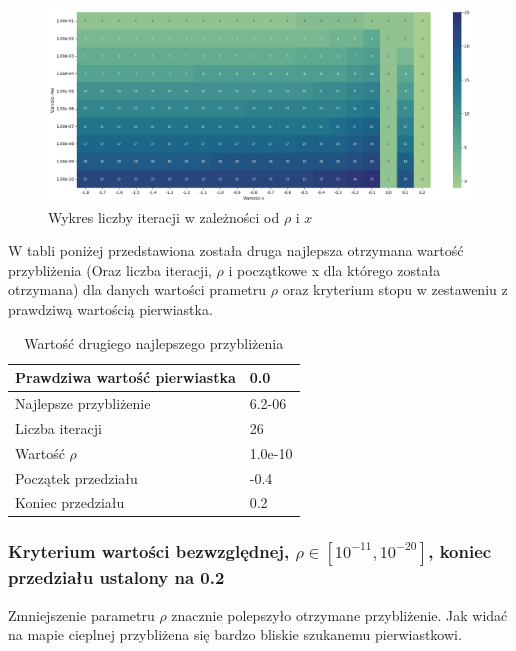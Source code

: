 \documentclass{article}
\begin{document}
\begin{figure}[H]
  \centering
  \begin{minipage}[b]{0.9\textwidth}
    \includegraphics[width=\textwidth]{heatmap14.png}
  \end{minipage}
  \caption{Wykres liczby iteracji w zależności od \(\rho\) i \(x\)}
\end{figure}

\noindent
W tabli poniżej przedstawiona została druga najlepsza otrzymana wartość przybliżenia (Oraz liczba iteracji, \(\rho\) i początkowe x dla którego została otrzymana) dla danych wartości prametru \(\rho\) oraz kryterium stopu w zestaweniu z prawdziwą wartością pierwiastka.

\begin{table}[H]
    \centering
    \begin{tabular}{|l|l|}
    \hline
        Prawdziwa wartość pierwiastka & 0.0 \\ \hline
        Najlepsze przybliżenie & 6.2-06 \\ \hline
        Liczba iteracji & 26 \\ \hline
        Wartość $\rho$ & 1.0e-10 \\ \hline
        Początek przedziału & -0.4 \\ \hline
        Koniec przedziału & 0.2 \\ \hline
    \end{tabular}
    \caption{Wartość drugiego najlepszego przybliżenia}
\end{table}

\subsubsection{Kryterium wartości bezwzględnej, \(\rho \in [10^{-11}, 10^{-20}]\), koniec przedziału ustalony na 0.2}

Zmniejszenie parametru \(\rho\) znacznie polepszyło otrzymane przybliżenie. Jak widać na mapie cieplnej przybliżena się bardzo bliskie szukanemu pierwiastkowi.
\end{document}
